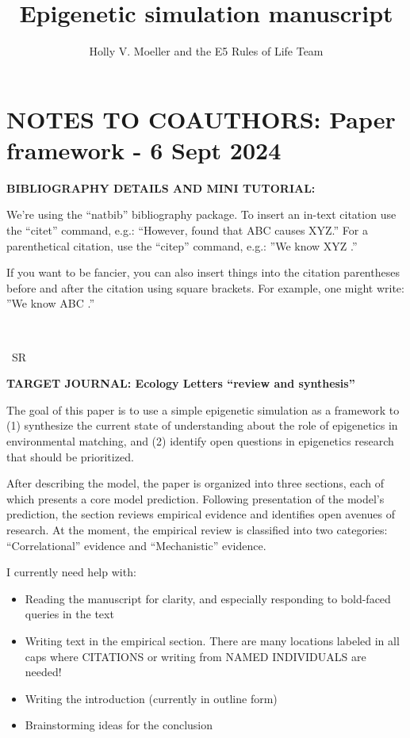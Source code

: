 \documentclass{article}
\title{Epigenetic simulation manuscript}
\author{Holly V. Moeller and the E5 Rules of Life Team }
\date{}
\begin{document}
\maketitle

\section*{NOTES TO COAUTHORS: Paper framework - 6 Sept 2024}


\noindent \textbf{BIBLIOGRAPHY DETAILS AND MINI TUTORIAL:}

We're using the ``natbib'' bibliography package. To insert an in-text citation use the ``citet'' command, e.g.: ``However, \citet{liew2018epigenome} found that ABC causes XYZ.'' For a parenthetical citation, use the ``citep'' command, e.g.: ''We know XYZ \citep{liew2018epigenome}.''

If you want to be fancier, you can also insert things into the citation parentheses before and after the citation using square brackets. For example, one might write: ''We know ABC \citep[see, e.g.,][]{liew2018epigenome}.''

\ 

\ 
SR


\noindent \textbf{TARGET JOURNAL: Ecology Letters ``review and synthesis''}   

The goal of this paper is to use a simple epigenetic simulation as a framework to (1) synthesize the current state of understanding about the role of epigenetics in environmental matching, and (2) identify open questions in epigenetics research that should be prioritized. 

After describing the model, the paper is organized into three sections, each of which presents a core model prediction. Following presentation of the model's prediction, the section reviews empirical evidence and identifies open avenues of research. At the moment, the empirical review is classified into two categories: ``Correlational'' evidence and ``Mechanistic'' evidence.

I currently need help with:
\begin{itemize}
    \item Reading the manuscript for clarity, and especially responding to bold-faced queries in the text
    \item Writing text in the empirical section. There are many locations labeled in all caps where CITATIONS or writing from NAMED INDIVIDUALS are needed!
    \item Writing the introduction (currently in outline form)
    \item Brainstorming ideas for the conclusion
\end{itemize}
\end{document}
